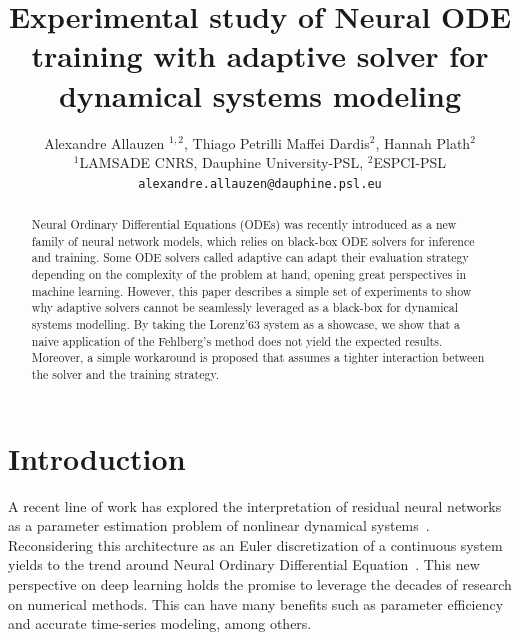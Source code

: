 \documentclass{article}
\title{Experimental study of Neural ODE training with adaptive solver
  for dynamical systems modeling}
\author{%
  Alexandre Allauzen $^{1,2}$, Thiago Petrilli Maffei Dardis$^{2}$, Hannah Plath$^{2}$\\
  $^{1}$LAMSADE CNRS, Dauphine University-PSL, $^{2}$ESPCI-PSL \\
  \texttt{alexandre.allauzen@dauphine.psl.eu}
}
\begin{document}
\maketitle

\begin{abstract}
  Neural Ordinary Differential Equations (ODEs) was recently
  introduced as a new family of neural network models, which relies on
  black-box ODE solvers for inference and training. Some ODE solvers
  called adaptive can adapt their evaluation strategy depending on the
  complexity of the problem at hand, opening great perspectives in
  machine learning. However, this paper describes a simple set of
  experiments to show why adaptive solvers cannot be seamlessly
  leveraged as a black-box for dynamical systems modelling. By taking
  the Lorenz'63 system as a showcase, we show that a naive application
  of the Fehlberg's method does not yield the expected
  results. Moreover, a simple workaround is proposed that assumes a
  tighter interaction between the solver and the training strategy.
\end{abstract}

\section{Introduction}
\label{sec:intro}



A recent line of work has explored the interpretation of residual
neural networks~\cite{He16Deep} as a parameter estimation problem of
nonlinear dynamical
systems~\cite{Haber17Stable,WE17Proposal,Lu18Beyond}.  Reconsidering
this architecture as an Euler discretization of a continuous system
yields to the trend around Neural Ordinary Differential
Equation~\cite{Chen18NODE}.  This new perspective on deep learning
holds the promise to leverage the decades of research on numerical
methods. This can have many benefits such as parameter efficiency and
accurate time-series modeling, among others.
\end{document}
